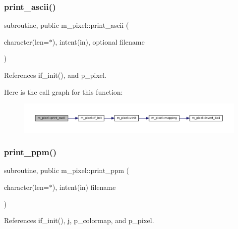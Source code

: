\mbox{\label{namespacem__pixel_ab2bb47aea567667b1b92c8265bcb36fb}} 
\subsubsection{\texorpdfstring{print\+\_\+ascii()}{print\_ascii()}}
{\footnotesize\ttfamily subroutine, public m\+\_\+pixel\+::print\+\_\+ascii (\begin{DoxyParamCaption}\item[{character(len=$\ast$), intent(in), optional}]{filename }\end{DoxyParamCaption})}



References if\+\_\+init(), and p\+\_\+pixel.

Here is the call graph for this function\+:
\nopagebreak
\begin{figure}[H]
\begin{center}
\leavevmode
\includegraphics[width=350pt]{namespacem__pixel_ab2bb47aea567667b1b92c8265bcb36fb_cgraph}
\end{center}
\end{figure}
\mbox{\label{namespacem__pixel_a01797b04ce7c693c3fd6a841e8d1de48}} 
\subsubsection{\texorpdfstring{print\+\_\+ppm()}{print\_ppm()}}
{\footnotesize\ttfamily subroutine, public m\+\_\+pixel\+::print\+\_\+ppm (\begin{DoxyParamCaption}\item[{character(len=$\ast$), intent(in)}]{filename }\end{DoxyParamCaption})}



References if\+\_\+init(), j, p\+\_\+colormap, and p\+\_\+pixel.

